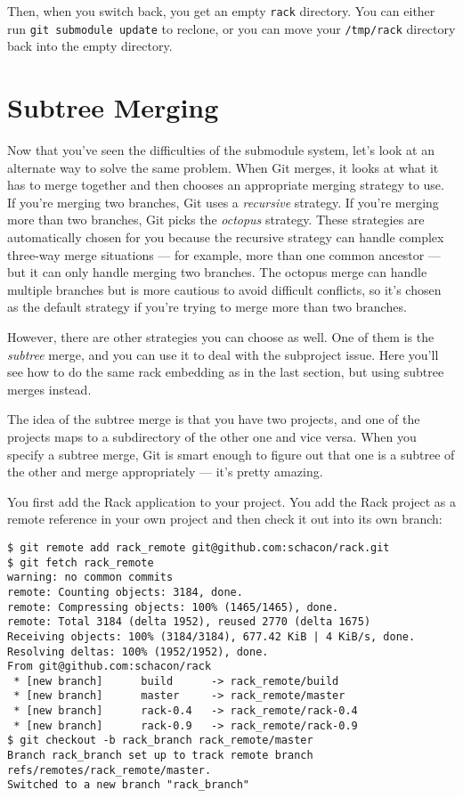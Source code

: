 \documentclass[a4paper]{book}
\begin{document}
Then, when you switch back, you get an empty \texttt{rack} directory. You can either run \texttt{git submodule update} to reclone, or you can move your \texttt{/tmp/rack} directory back into the empty directory.

\section{Subtree Merging}

Now that you've seen the difficulties of the submodule system, let's look at an alternate way to solve the same problem. When Git merges, it looks at what it has to merge together and then chooses an appropriate merging strategy to use. If you're merging two branches, Git uses a \emph{recursive} strategy. If you're merging more than two branches, Git picks the \emph{octopus} strategy. These strategies are automatically chosen for you because the recursive strategy can handle complex three-way merge situations --- for example, more than one common ancestor --- but it can only handle merging two branches. The octopus merge can handle multiple branches but is more cautious to avoid difficult conflicts, so it's chosen as the default strategy if you're trying to merge more than two branches.

However, there are other strategies you can choose as well. One of them is the \emph{subtree} merge, and you can use it to deal with the subproject issue. Here you'll see how to do the same rack embedding as in the last section, but using subtree merges instead.

The idea of the subtree merge is that you have two projects, and one of the projects maps to a subdirectory of the other one and vice versa. When you specify a subtree merge, Git is smart enough to figure out that one is a subtree of the other and merge appropriately --- it's pretty amazing.

You first add the Rack application to your project. You add the Rack project as a remote reference in your own project and then check it out into its own branch:

\begin{shaded}\begin{verbatim}
$ git remote add rack_remote git@github.com:schacon/rack.git
$ git fetch rack_remote
warning: no common commits
remote: Counting objects: 3184, done.
remote: Compressing objects: 100% (1465/1465), done.
remote: Total 3184 (delta 1952), reused 2770 (delta 1675)
Receiving objects: 100% (3184/3184), 677.42 KiB | 4 KiB/s, done.
Resolving deltas: 100% (1952/1952), done.
From git@github.com:schacon/rack
 * [new branch]      build      -> rack_remote/build
 * [new branch]      master     -> rack_remote/master
 * [new branch]      rack-0.4   -> rack_remote/rack-0.4
 * [new branch]      rack-0.9   -> rack_remote/rack-0.9
$ git checkout -b rack_branch rack_remote/master
Branch rack_branch set up to track remote branch refs/remotes/rack_remote/master.
Switched to a new branch "rack_branch"
\end{verbatim}\end{shaded}
\end{document}
